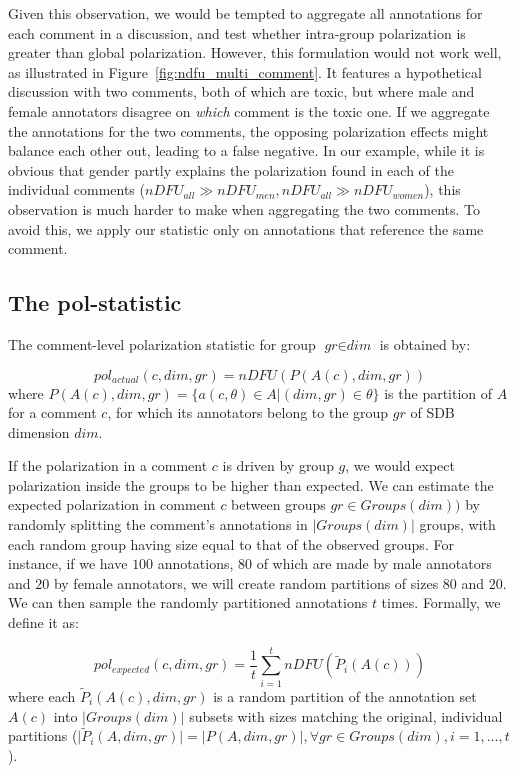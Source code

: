 \documentclass{article}
\newcommand{\sdbdim}{\textit{dim}}
\newcommand{\sdbgroup}{\textit{gr}}
\newcommand{\Sdbgroup}{\textit{Groups}}
\begin{document}
 Given this observation, we would be tempted to aggregate all annotations for each comment in a discussion, and test whether intra-group polarization is greater than global polarization. However, this formulation would not work well, as illustrated in  Figure~\ref{fig:ndfu_multi_comment}. It features a hypothetical discussion with two comments, both of which are toxic, but where male and female annotators disagree on \emph{which} comment is the toxic one. If we aggregate the annotations for the two comments, the opposing polarization effects might balance each other out, leading to a false negative. In our example, while it is obvious that gender partly explains the polarization found in each of the individual comments ($nDFU_{all} \gg nDFU_{men}, nDFU_{all} \gg nDFU_{women}$), this observation is much harder to make when aggregating the two comments. To avoid this, we apply our statistic only on annotations that reference the same comment. 
 
 \subsection{The pol-statistic}
  
 The comment-level polarization statistic for group $\sdbgroup \in \sdbdim$ is obtained by:
 
 \begin{equation}
 	pol_{actual}(c, \sdbdim, \sdbgroup) = nDFU(P(A(c), \sdbdim, \sdbgroup))
 \end{equation}
 \noindent where $P(A(c),\sdbdim, \sdbgroup) = \{a(c, \theta) \in A | (\sdbdim, \sdbgroup) \in \theta\}$ is the partition of $A$ for a comment $c$, for which its annotators belong  to the group $\sdbgroup$ of \ac{SDB} dimension $\sdbdim$.
 
 If the polarization in a comment $c$ is driven by group $g$, we would expect polarization inside the groups to be higher than expected. We can estimate the expected polarization in comment $c$ between groups $\sdbgroup \in \Sdbgroup(\sdbdim))$ by randomly splitting the comment's annotations in $\lvert \Sdbgroup(\sdbdim) \rvert$ groups, with each random group having size equal to that of the observed groups. For instance, if we have $100$ annotations, $80$ of which are made by male annotators and $20$ by female annotators, we will create random partitions of sizes $80$ and $20$. We can then sample the randomly partitioned annotations $t$ times. Formally, we define it as:
 
 \begin{equation}
 	pol_{expected}(c, \sdbdim, \sdbgroup) = \frac{1}{t} \sum_{i=1}^t  nDFU(\tilde{P}_i(A(c)))
 \end{equation}
 \noindent where each $\tilde{P}_i(A(c), \sdbdim, \sdbgroup)$ is a random partition of the annotation set $A(c)$ into $\lvert \Sdbgroup(\sdbdim) \rvert$ subsets with sizes matching the original, individual partitions ($\lvert \tilde{P}_i(A, \sdbdim, \sdbgroup) \rvert = \lvert P(A, \sdbdim, \sdbgroup) \rvert, \forall \sdbgroup \in \Sdbgroup(\sdbdim) , i=1, \ldots, t$).
 
\end{document}
